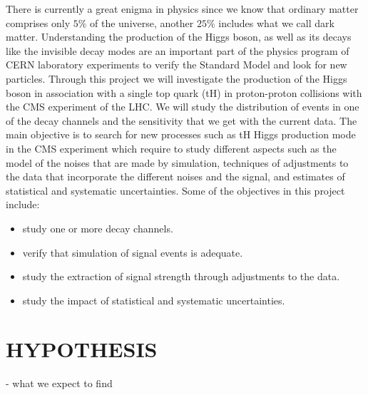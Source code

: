 \documentclass{article}
\begin{document}
\onehalfspacing There is currently a great enigma in physics since we know that ordinary matter comprises 
only $5\%$ of the universe, another 
$25\%$ includes what we call dark matter. Understanding the production of the Higgs boson, as 
well as its decays like the invisible decay modes are an important part of the physics 
program of CERN laboratory experiments to verify the Standard Model and look for new 
particles. Through this project we will investigate the production of the Higgs boson in 
association with a single top quark (tH) in proton-proton collisions with the CMS experiment 
of the LHC. We will study the distribution of events in one of the decay channels and the 
sensitivity that we get with the current data. The main objective is to search for new 
processes such as tH Higgs production mode in the CMS experiment which require to study 
different aspects such as the model of the noises that are made by simulation, techniques of 
adjustments to the data that incorporate the different noises and the signal, and estimates 
of statistical and systematic uncertainties.
Some of the objectives in this project include:\\
\begin{itemize}
\item study one or more decay channels.\\
\item verify that simulation of signal events is adequate.\\
\item study the extraction of signal strength through adjustments to the data.\\
\item study the impact of statistical and systematic uncertainties.\\
\end{itemize}

\section{HYPOTHESIS}
- what we expect to find\\
\end{document}
